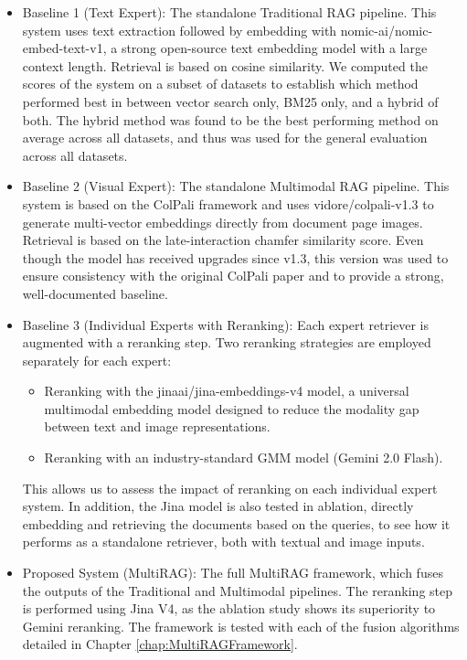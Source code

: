 \documentclass[12pt,twoside]{report}
\begin{document}
\begin{itemize}
\item{Baseline 1 (Text Expert)}: The standalone Traditional RAG pipeline. This system uses text extraction followed by embedding with nomic-ai/nomic-embed-text-v1, a strong open-source text embedding model with a large context length. Retrieval is based on cosine similarity. We computed the scores of the system on a subset of datasets to establish which method performed best in between vector search only, BM25 only, and a hybrid of both. The hybrid method was found to be the best performing method on average across all datasets, and thus was used for the general evaluation across all datasets.

\item{Baseline 2 (Visual Expert)}: The standalone Multimodal RAG pipeline. This system is based on the ColPali framework and uses vidore/colpali-v1.3 to generate multi-vector embeddings directly from document page images. Retrieval is based on the late-interaction chamfer similarity score. Even though the model has received upgrades since v1.3, this version was used to ensure consistency with the original ColPali paper and to provide a strong, well-documented baseline.

\item{Baseline 3 (Individual Experts with Reranking)}: Each expert retriever is augmented with a reranking step. Two reranking strategies are employed separately for each expert:
\begin{itemize}
\item Reranking with the jinaai/jina-embeddings-v4 model, a universal multimodal embedding model designed to reduce the modality gap between text and image representations.
\item Reranking with an industry-standard GMM model (Gemini 2.0 Flash).
\end{itemize}
This allows us to assess the impact of reranking on each individual expert system. In addition, the Jina model is also tested in ablation, directly embedding and retrieving the documents based on the queries, to see how it performs as a standalone retriever, both with textual and image inputs.

\item{Proposed System (MultiRAG)}: The full MultiRAG framework, which fuses the outputs of the Traditional and Multimodal pipelines. The reranking step is performed using Jina V4, as the ablation study shows its superiority to Gemini reranking. The framework is tested with each of the fusion algorithms detailed in Chapter \ref{chap:MultiRAGFramework}.
\end{itemize}
\end{document}
